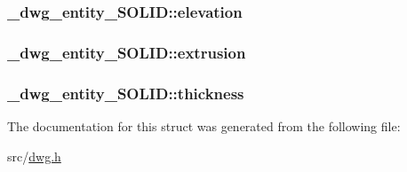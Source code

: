 \hypertarget{struct__dwg__entity__SOLID_a3b2bdde8d317a95572a20b42d952271e}{
\subsubsection[{elevation}]{ {\bf \-\_\-dwg\-\_\-entity\-\_\-\-S\-O\-L\-I\-D\-::elevation}}}\label{struct__dwg__entity__SOLID_a3b2bdde8d317a95572a20b42d952271e}
\hypertarget{struct__dwg__entity__SOLID_aace62250e0b87a934707e97d1d5e186f}{
\subsubsection[{extrusion}]{ {\bf \-\_\-dwg\-\_\-entity\-\_\-\-S\-O\-L\-I\-D\-::extrusion}}}\label{struct__dwg__entity__SOLID_aace62250e0b87a934707e97d1d5e186f}
\hypertarget{struct__dwg__entity__SOLID_a88f311e6fd279eb4798928b2e32bf1a2}{
\subsubsection[{thickness}]{ {\bf \-\_\-dwg\-\_\-entity\-\_\-\-S\-O\-L\-I\-D\-::thickness}}}\label{struct__dwg__entity__SOLID_a88f311e6fd279eb4798928b2e32bf1a2}


\-The documentation for this struct was generated from the following file\-:\begin{DoxyCompactItemize}
\item 
src/\hyperlink{dwg_8h}{dwg.\-h}\end{DoxyCompactItemize}
